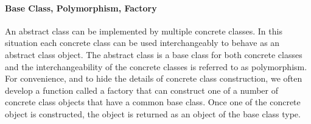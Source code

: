 \documentclass[12pt,relax]{SANDreport}
\begin{document}
\paragraph{Base Class, Polymorphism, Factory}
An abstract class can be implemented by multiple concrete classes.  In this situation each
concrete class can be used interchangeably to behave as an abstract class object.  The abstract
class is a base class for both concrete classes and the interchangeability of the concrete
classes is referred to as polymorphism.  For convenience, and to hide the details of concrete
class construction, we often develop a function called a factory
that can construct one of a number of concrete class objects that have a common base class.  Once
one of the concrete object is constructed, the object is returned as an object of the base 
class type.


    \begin{SANDdistribution}
	\bigskip




    \end{SANDdistribution}
\end{document}
